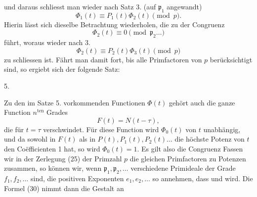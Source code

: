 und daraus schliesst man wieder nach Satz 3. (auf $\mathfrak p_1$ angewandt)
\[ \Phi_1(t) \equiv P_1(t) \Phi_2(t) \pmod p. \]
Hierin lässt sich dieselbe Betrachtung wiederholen, die zu der Congruenz
\[ \Phi_2(t) \equiv 0 \pmod{\mathfrak p_2 \ldots} \]
führt, woraus wieder nach 3.
\[ \Phi_2(t) \equiv P_2(t) \Phi_3(t) \pmod p \]
zu schliessen ist. Fährt man damit fort, bis alle Primfactoren von $p$ berücksichtigt sind, so ergiebt sich der folgende Satz:

5. 


Zu den im Satze 5. vorkommenden Functionen $\Phi(t)$ gehört auch die ganze Function $n^{\mathrm{ten}}$ Grades
\[ F(t) = N(t-\tau), \]
die für $t=\tau$ verschwindet. Für diese Function wird $\Phi_0(t)$ von $t$ unabhängig, und da sowohl in $F(t)$ als in $P(t), P_1(t), P_2(t) \ldots$ die höchste Potenz von $t$ den Coëfficienten 1 hat, so wird $\Phi_0(t) = 1$. Es gilt also die Congruenz
Fassen wir in der Zerlegung (25) der Primzahl $p$ die gleichen Primfactoren zu Potenzen zusammen, so können wir, wenn $\mathfrak p_1, \mathfrak p_2, \ldots$ verschiedene Primideale der Grade $f_1, f_2, \ldots$ sind, die positiven Exponenten $e_1, e_2, \ldots$ so annehmen, dass
und
wird. Die Formel (30) nimmt dann die Gestalt an

